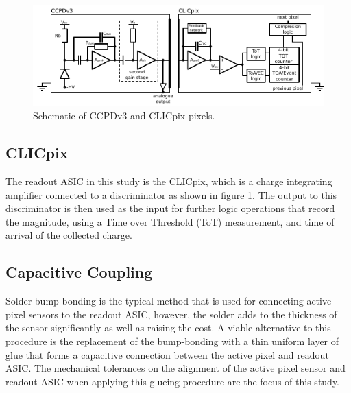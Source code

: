 \begin{figure}
\centering
\includegraphics[width=1.0\textwidth]{CLICdpVertex/Plots/schematic.pdf}
\caption[Schematic of CCPDv3 and CLICpix pixels.]{Schematic of CCPDv3 and CLICpix pixels.}
\label{fig:ccpdandclicpix}
\end{figure}


\subsection{CLICpix}
The readout ASIC in this study is the CLICpix, which is a charge integrating amplifier connected to a discriminator as shown in figure \ref{fig:ccpdandclicpix}.  The output to this discriminator is then used as the input for further logic operations that record the magnitude, using a Time over Threshold (ToT) measurement, and time of arrival of the collected charge.


\subsection{Capacitive Coupling}
Solder bump-bonding is the typical method that is used for connecting active pixel sensors to the readout ASIC, however, the solder adds to the thickness of the sensor significantly as well as raising the cost.  A viable alternative to this procedure is the replacement of the bump-bonding with a thin uniform layer of glue that forms a capacitive connection between the active pixel and readout ASIC.  The mechanical tolerances on the alignment of the active pixel sensor and readout ASIC when applying this glueing procedure are the focus of this study.  


